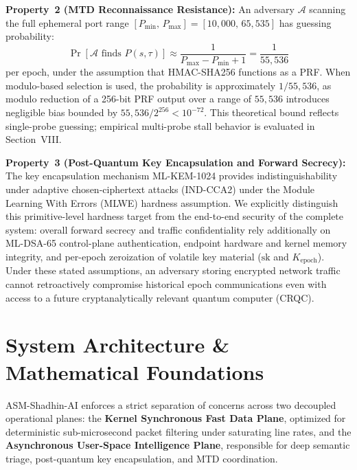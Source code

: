\documentclass[journal]{IEEEtran}
\renewcommand{\_}{\textunderscore\allowbreak}
\begin{document}
\textbf{Property~2 (MTD Reconnaissance Resistance):}
An adversary $\mathcal{A}$ scanning the full ephemeral port range
$[P_{\min},\, P_{\max}] = [10{,}000,\, 65{,}535]$ has guessing probability:
\begin{equation}
  \Pr\!\left[\mathcal{A}\text{ finds }P(s,\tau)\right]
    \approx \frac{1}{P_{\max} - P_{\min} + 1} = \frac{1}{55{,}536}
  \label{eq:mtd_resistance}
\end{equation}
per epoch, under the assumption that HMAC-SHA256 functions as a PRF. When modulo-based
selection is used, the probability is approximately $1/55{,}536$, as modulo reduction
of a 256-bit PRF output over a range of $55{,}536$ introduces negligible bias bounded
by $55{,}536 / 2^{256} < 10^{-72}$. This theoretical bound reflects single-probe guessing;
empirical multi-probe stall behavior is evaluated in Section~VIII.

\textbf{Property~3 (Post-Quantum Key Encapsulation and Forward Secrecy):}
The key encapsulation mechanism ML-KEM-1024 provides indistinguishability under
adaptive chosen-ciphertext attacks (IND-CCA2) under the Module Learning With Errors
(MLWE) hardness assumption. We explicitly distinguish this primitive-level
hardness target from the end-to-end security of the complete system: overall
forward secrecy and traffic confidentiality rely additionally on ML-DSA-65
control-plane authentication, endpoint hardware and kernel memory integrity, and
per-epoch zeroization of volatile key material ($\text{sk}$ and $K_{\text{epoch}}$).
Under these stated assumptions, an adversary storing encrypted network traffic cannot
retroactively compromise historical epoch communications even with access to a future
cryptanalytically relevant quantum computer (CRQC).

\section{System Architecture \& Mathematical Foundations}
ASM-Shadhin-AI enforces a strict separation of concerns across two decoupled
operational planes: the \textbf{Kernel Synchronous Fast Data Plane}, optimized
for deterministic sub-microsecond packet filtering under saturating line rates, and the
\textbf{Asynchronous User-Space Intelligence Plane}, responsible for deep
semantic triage, post-quantum key encapsulation, and MTD coordination.
\end{document}
